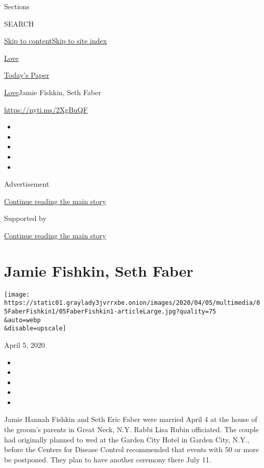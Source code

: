 Sections

SEARCH

\protect\hyperlink{site-content}{Skip to
content}\protect\hyperlink{site-index}{Skip to site index}

\href{https://www.nytimes3xbfgragh.onion/section/fashion/weddings}{Love}

\href{https://myaccount.nytimes3xbfgragh.onion/auth/login?response_type=cookie\&client_id=vi}{}

\href{https://www.nytimes3xbfgragh.onion/section/todayspaper}{Today's
Paper}

\href{/section/fashion/weddings}{Love}\textbar{}Jamie Fishkin, Seth
Faber

\url{https://nyti.ms/2XgBuQF}

\begin{itemize}
\item
\item
\item
\item
\item
\end{itemize}

Advertisement

\protect\hyperlink{after-top}{Continue reading the main story}

Supported by

\protect\hyperlink{after-sponsor}{Continue reading the main story}

\hypertarget{jamie-fishkin-seth-faber}{%
\section{Jamie Fishkin, Seth Faber}\label{jamie-fishkin-seth-faber}}

\texttt{[image: https://static01.graylady3jvrrxbe.onion/images/2020/04/05/multimedia/05FaberFishkin1/05FaberFishkin1-articleLarge.jpg?quality=75\\\&auto=webp\\\&disable=upscale]}

April 5, 2020

\begin{itemize}
\item
\item
\item
\item
\item
\end{itemize}

Jamie Hannah Fishkin and Seth Eric Faber were married April 4 at the
house of the groom's parents in Great Neck, N.Y. Rabbi Lisa Rubin
officiated. The couple had originally planned to wed at the Garden City
Hotel in Garden City, N.Y., before the Centers for Disease Control
recommended that events with 50 or more be postponed. They plan to have
another ceremony there July 11.

